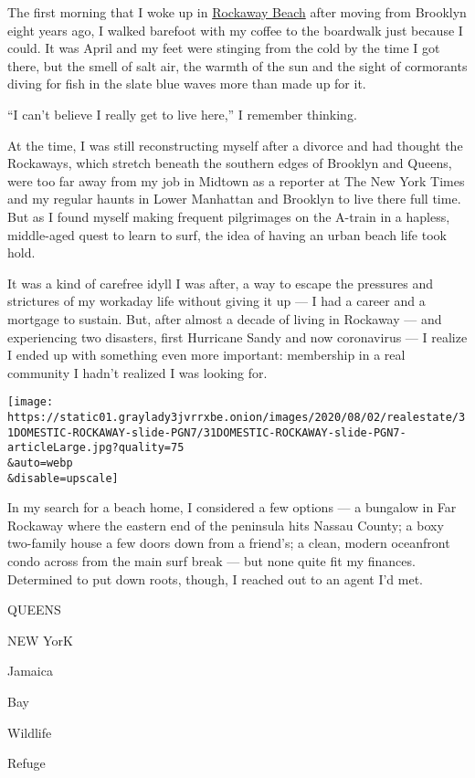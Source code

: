 The first morning that I woke up in
\href{https://www.nytimes3xbfgragh.onion/2016/06/05/realestate/rockaway-beach-city-life-with-sand-and-surf.html}{Rockaway
Beach} after moving from Brooklyn eight years ago, I walked barefoot
with my coffee to the boardwalk just because I could. It was April and
my feet were stinging from the cold by the time I got there, but the
smell of salt air, the warmth of the sun and the sight of cormorants
diving for fish in the slate blue waves more than made up for it.

``I can't believe I really get to live here,'' I remember thinking.

At the time, I was still reconstructing myself after a divorce and had
thought the Rockaways, which stretch beneath the southern edges of
Brooklyn and Queens, were too far away from my job in Midtown as a
reporter at The New York Times and my regular haunts in Lower Manhattan
and Brooklyn to live there full time. But as I found myself making
frequent pilgrimages on the A-train in a hapless, middle-aged quest to
learn to surf, the idea of having an urban beach life took hold.

It was a kind of carefree idyll I was after, a way to escape the
pressures and strictures of my workaday life without giving it up --- I
had a career and a mortgage to sustain. But, after almost a decade of
living in Rockaway --- and experiencing two disasters, first Hurricane
Sandy and now coronavirus --- I realize I ended up with something even
more important: membership in a real community I hadn't realized I was
looking for.

\texttt{[image: https://static01.graylady3jvrrxbe.onion/images/2020/08/02/realestate/31DOMESTIC-ROCKAWAY-slide-PGN7/31DOMESTIC-ROCKAWAY-slide-PGN7-articleLarge.jpg?quality=75\\\&auto=webp\\\&disable=upscale]}

In my search for a beach home, I considered a few options --- a bungalow
in Far Rockaway where the eastern end of the peninsula hits Nassau
County; a boxy two-family house a few doors down from a friend's; a
clean, modern oceanfront condo across from the main surf break --- but
none quite fit my finances. Determined to put down roots, though, I
reached out to an agent I'd met.

QUEENS

NEW YorK

Jamaica

Bay

Wildlife

Refuge

